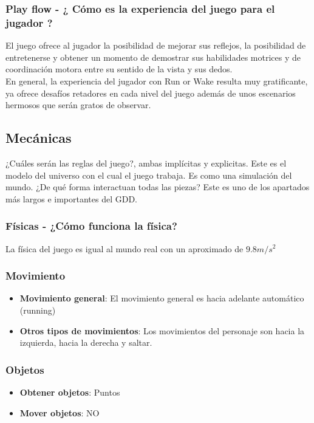 \subsubsection{ Play flow - ¿ Cómo es la experiencia del juego para el jugador ?}

El juego ofrece al jugador la posibilidad de mejorar sus reflejos, la posibilidad
de entretenerse y obtener un momento de demostrar sus habilidades motrices y de 
coordinación motora entre su sentido de la vista y sus dedos.\\

En general, la experiencia del jugador con Run or Wake resulta muy gratificante, ya 
ofrece desafíos retadores en cada nivel del juego además de unos escenarios hermosos
que serán gratos de observar.

\subsection{Mecánicas}
¿Cuáles serán las reglas del juego?, ambas implícitas y explicitas. Este es el modelo del 
universo con el cual el juego trabaja. Es como una simulación del mundo. ¿De qué forma interactuan
todas las piezas? Este es uno de los apartados más largos e importantes del GDD.

\subsubsection{Físicas - ¿Cómo funciona la física?}

La física del juego es igual al mundo real con un aproximado de $9.8 m/s^2 $

\subsubsection{Movimiento}
\begin{itemize}
  \item \textbf{Movimiento general}: El movimiento general es hacia adelante automático (running)
  \item \textbf{Otros tipos de movimientos}: Los movimientos del personaje son
    hacia la izquierda, hacia la derecha y  saltar.
\end{itemize}

\subsubsection{Objetos}
\begin{itemize}
  \item \textbf{Obtener objetos}: Puntos
  \item \textbf{Mover objetos}: NO
\end{itemize}

